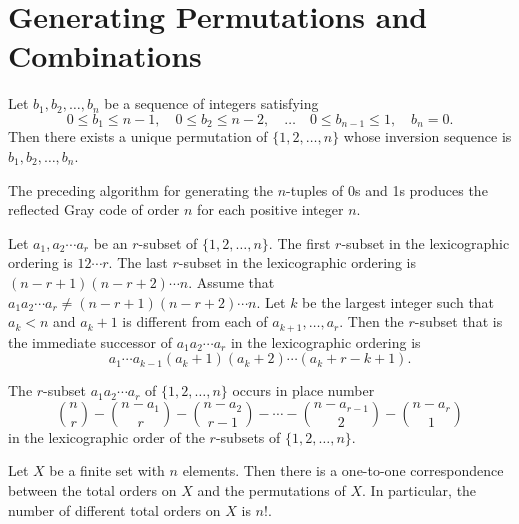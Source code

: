 \chapter{Generating Permutations and Combinations}

\begin{theorem}
    \label{thm:4.2.1}
Let $b_1, b_2, \dots, b_n$ be a sequence of integers satisfying
\[
0 \leq b_1 \leq n-1, \quad 0 \leq b_2 \leq n-2,\quad \dots \quad 0 \leq b_{n-1} \leq 1, \quad b_n = 0.
\]
Then there exists a unique permutation of $\{1, 2, \dots, n\}$ whose inversion sequence is $b_1, b_2, \dots, b_n$.
\end{theorem} 

\begin{theorem}
  \label{thm:4.3.1}
  The preceding algorithm for generating the $n$-tuples of 0s and 1s 
  produces the reflected Gray code of order $n$ for each positive integer $n$.
\end{theorem} 

\begin{theorem}
  \label{thm:4.4.1}
  Let $a_1, a_2 \cdots a_r$ be an $r$-subset of $\{1, 2, \dots, n\}$. 
  The first $r$-subset in the lexicographic ordering is $1 2 \cdots r$. The last $r$-subset 
  in the lexicographic ordering is $(n-r+1)(n-r+2) \cdots n$. Assume that 
  $a_1a_2 \cdots a_r \neq (n-r+1)(n-r+2) \cdots n$. Let $k$ be the largest integer such that 
  $a_k < n$ and $a_k + 1$ is different from each of $a_{k+1}, \dots, a_r$. Then the $r$-subset 
  that is the immediate successor of $a_1a_2 \cdots a_r$ in the lexicographic ordering is
  \[
  a_1 \cdots a_{k-1}(a_k + 1)(a_k + 2) \cdots (a_k + r - k + 1).
  \]
\end{theorem} 


\begin{theorem}
    \label{thm:4.4.2}
The $r$-subset $a_1a_2 \cdots a_r$ of $\{1, 2, \dots, n\}$ occurs in place number
\[
\binom{n}{r} - \binom{n - a_1}{r} - \binom{n - a_2}{r-1} - \cdots - \binom{n - a_{r-1}}{2} - \binom{n - a_r}{1}
\]
in the lexicographic order of the $r$-subsets of $\{1, 2, \dots, n\}$.
\end{theorem} 

\begin{theorem}
    \label{thm:4.5.1}
Let $X$ be a finite set with $n$ elements. Then there is a one-to-one correspondence between the total orders on $X$ and the permutations of $X$. In particular, the number of different total orders on $X$ is $n!$.
\end{theorem} 

